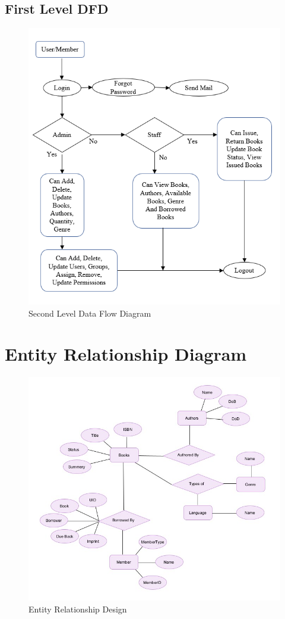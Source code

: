 \subsection{First Level DFD}
\begin{figure}[htb]
	\centering
	\includegraphics[scale=0.8]{./dfd-1} 
	\caption{Second Level Data Flow Diagram}
	\label{fig:label} 
\end{figure}

\newpage
\section{Entity Relationship Diagram}
\begin{figure}[htb]
	\centering
	\includegraphics[scale=0.8]{./entity-relationship} 
	\caption{Entity Relationship Design}
	\label{fig:label} 
\end{figure}




